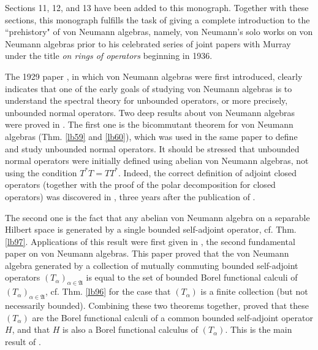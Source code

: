 \documentclass[12pt,b5paper,notitlepage]{article}
\theoremstyle{definition}
\theoremstyle{plain}
\newcommand{\fk}{\mathfrak}
\numberwithin{equation}{section}
\begin{document}
Sections 11, 12, and 13 have been added to this monograph. Together with these sections, this monograph fulfills the task of giving a complete introduction to the ``prehistory" of von Neumann algebras, namely, von Neumann's solo works on von Neumann algebras prior to his celebrated series of joint papers with Murray under the title \textit{on rings of operators} beginning in 1936.


The 1929 paper \cite{vNeu29}, in which von Neumann algebras were first introduced, clearly indicates that one of the early goals of studying von Neumann algebras is to understand the spectral theory for unbounded operators, or more precisely, unbounded normal operators. Two deep results about von Neumann algebras were proved in \cite{vNeu32}. The first one is the bicommutant theorem for von Neumann algebras (Thm. \ref{lb59} and \ref{lb60}), which was used in the same paper to define and study unbounded normal operators. It should be stressed that unbounded normal operators were initially defined using abelian von Neumann algebras, not using the condition $T^*T=TT^*$. Indeed, the correct definition of adjoint closed operators (together with the proof of the polar decomposition for closed operators) was discovered in \cite{vNeu32}, three years after the publication of \cite{vNeu29}.


The second one is the fact that any abelian von Neumann algebra on a separable Hilbert space is generated by a single bounded self-adjoint operator, cf. Thm. \ref{lb97}. Applications of this result were first given in \cite{vNeu31}, the second fundamental paper on von Neumann algebras. This paper proved that the von Neumann algebra generated by a collection of mutually commuting bounded self-adjoint operators $(T_\alpha)_{\alpha\in\fk A}$ is equal to the set of bounded Borel functional calculi of $(T_\alpha)_{\alpha\in\fk A}$, cf. Thm. \ref{lb96} for the case that $(T_\alpha)$ is a finite collection (but not necessarily bounded). Combining these two theorems together, \cite{vNeu31} proved that these $(T_\alpha)$ are the Borel functional calculi of a common bounded self-adjoint operator $H$, and that $H$ is also a Borel functional calculus of $(T_\alpha)$. This is the main result of \cite{vNeu31}. 
\end{document}
